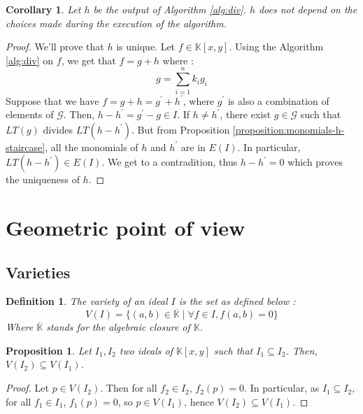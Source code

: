 \documentclass{article}
\newtheorem{corollary}{Corollary}[theorem]
\newtheorem{definition}{Definition}[section]
\newtheorem{proposition}{Proposition}[section]
\begin{document}
\begin{corollary}
    Let $h$ be the output of Algorithm \ref{alg:div}. $h$ does not depend on the choices made during the execution of the algorithm. 
\end{corollary}

\begin{proof}
    We'll prove that $h$ is unique. Let $f \in \mathbb{K}[x, y]$. Using the Algorithm \ref{alg:div} on $f$, we get that $f = g + h$ where : 
    \begin{displaymath}
        g = \sum_{i = 1}^{n} k_{i}g_{i} 
    \end{displaymath}
    Suppose that we have $f = g + h = g^{\prime} + h^{\prime}$, where $g^{\prime}$ is also a combination of elements of $\mathscr{G}$. Then, $h - h^{\prime} = g^{\prime} - g \in I$. If $h \neq h^{\prime}$, there exist $g \in \mathscr{G}$ such that $LT(g)$ divides $LT(h - h^{\prime})$. But from Proposition \ref{proposition:monomials-h-staircase}, all the monomials of $h$ and $h^{\prime}$ are in $E(I)$. In particular, $LT(h - h^{\prime}) \in E(I)$. We get to a contradition, thus $h - h^{\prime} = 0$ which proves the uniqueness of $h$.
\end{proof}

\section{Geometric point of view}

\subsection*{Varieties}

\begin{definition}
    The variety of an ideal $I$ is the set as defined below : 
    \begin{displaymath}
        V(I) = \{ (a, b) \in \overline{\mathbb{K}} \mid \forall f \in I, f(a, b) = 0 \}
    \end{displaymath}
    Where $\overline{\mathbb{K}}$ stands for the algebraic closure of $\mathbb{K}$. 
\end{definition}

\begin{proposition}
    Let $I_{1}, I_{2}$ two ideals of $\mathbb{K}[x, y]$ such that $I_{1} \subseteq I_{2}$. Then, $V(I_{2}) \subseteq V(I_{1})$.
\end{proposition}

\begin{proof}
    Let $p \in V(I_{2})$. Then for all $f_{2} \in I_{2}$, $f_{2}(p) = 0$. In particular, as $I_{1} \subseteq I_{2}$, for all $f_{1} \in I_{1}$, $f_{1}(p) = 0$, so $p \in V(I_{1})$, hence $V(I_{2}) \subseteq V(I_{1})$.
\end{proof}
\end{document}
